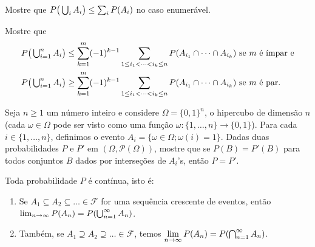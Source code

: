 \documentclass[../main/Notas_de_aula.tex]{subfiles}
\begin{document}
\begin{exercise}
  Mostre que $P\big(\operatorname*{{\textstyle \bigcup}}\nolimits_i A_i\big) \leq \sum_i P(A_i)$ no caso enumerável.
\end{exercise}

\begin{exercise}
  Mostre que
  \begin{equation*}
    \begin{split}
      P\big( \operatorname*{{\textstyle \bigcup}}\nolimits_{i=1}^n A_i \big) & \leq \sum\limits_{k = 1}^m (-1)^{k-1} \sum\limits_{1 \leq i_1 < \dots < i_k \leq n} P(A_{i_1} \cap \dots \cap A_{i_k}) \text{ se $m$ é ímpar e}\\
      P\big( \operatorname*{{\textstyle \bigcup}}\nolimits_{i=1}^n A_i \big) & \geq \sum\limits_{k = 1}^m (-1)^{k-1} \sum\limits_{1 \leq i_1 < \dots < i_k \leq n} P(A_{i_1} \cap \dots \cap A_{i_k}) \text{ se $m$ é par.}
    \end{split}
  \end{equation*}
\end{exercise}



\begin{exercise}
  Seja $n \geq 1$ um número inteiro e considere $\Omega = \{0, 1\}^n$, o hipercubo de dimensão $n$ (cada $\omega \in \Omega$ pode ser visto como uma função $\omega:\{1, \dots, n\} \to \{0,1\}$).
  Para cada $i \in \{1, \dots, n\}$, definimos o evento $A_i = \{ \omega \in \Omega; \omega(i) = 1 \}$.
  Dadas duas probabilidades $P$ e $P'$ em $(\Omega, \mathcal{P}(\Omega))$, mostre que se $P(B) = P'(B)$ para todos conjuntos $B$ dados por interseções de $A_i$'s, então $P = P'$.
\end{exercise}

\begin{proposition}
  \label{p:prob_continua}
  Toda probabilidade $P$ é contínua, isto é:
  \begin{enumerate}[\quad a)]
  \item Se $A_1 \subseteq A_2 \subseteq \dots \in \mathcal{F}$ for uma sequência crescente de eventos, então \\
  $\lim_{n\to \infty} P(A_n) = P(\operatorname*{{\textstyle \bigcup}}\nolimits_{n=1}^{\infty} A_n)$.
  \item Também, se $A_1 \supseteq A_2 \supseteq \dots \in \mathcal{F}$, temos $\lim\limits _{n\to \infty} P(A_n) = P(\operatorname*{{\textstyle \bigcap}}\nolimits_{n=1}^{\infty} A_n)$.
  \end{enumerate}
\end{proposition}
\end{document}
